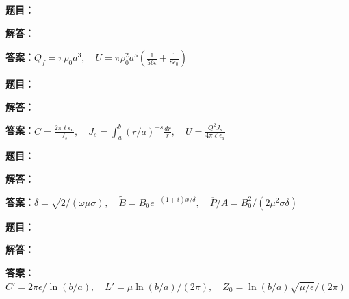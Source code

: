 \documentclass[lang=cn,color=blue,11pt]{elegantbook}
\begin{document}
\par
\noindent\textbf{题目：}
\par\noindent\textbf{解答：}
\par\noindent\textbf{答案：}\(\displaystyle Q_f=\pi\rho_0a^3,\quad U=\pi\rho_0^2a^5\left(\frac1{56\epsilon}+\frac1{8\epsilon_0}\right)\)\par
\par\smallskip\noindent\hrulefill\par\medskip
{}\par
\noindent\textbf{题目：}
\par\noindent\textbf{解答：}
\par\noindent\textbf{答案：}\(\displaystyle C=\frac{2\pi\ell\epsilon_a}{J_s},\quad J_s=\int_a^b(r/a)^{-s}\frac{dr}{r},\quad U=\frac{Q^2J_s}{4\pi\ell\epsilon_a}\)\par
\par\smallskip\noindent\hrulefill\par\medskip
{}\par
\noindent\textbf{题目：}
\par\noindent\textbf{解答：}
\par\noindent\textbf{答案：}\(\displaystyle \delta=\sqrt{2/(\omega\mu\sigma)},\quad \tilde B=B_0e^{-(1+i)x/\delta},\quad \overline P/A=B_0^2/(2\mu^2\sigma\delta)\)\par
\par\smallskip\noindent\hrulefill\par\medskip
{}\par
\noindent\textbf{题目：}
\par\noindent\textbf{解答：}
\par\noindent\textbf{答案：}\(\displaystyle C'=2\pi\epsilon/\ln(b/a),\quad L'=\mu\ln(b/a)/(2\pi),\quad Z_0=\ln(b/a)\sqrt{\mu/\epsilon}/(2\pi)\)\par
\par\smallskip\noindent\hrulefill\par\medskip
\end{document}
